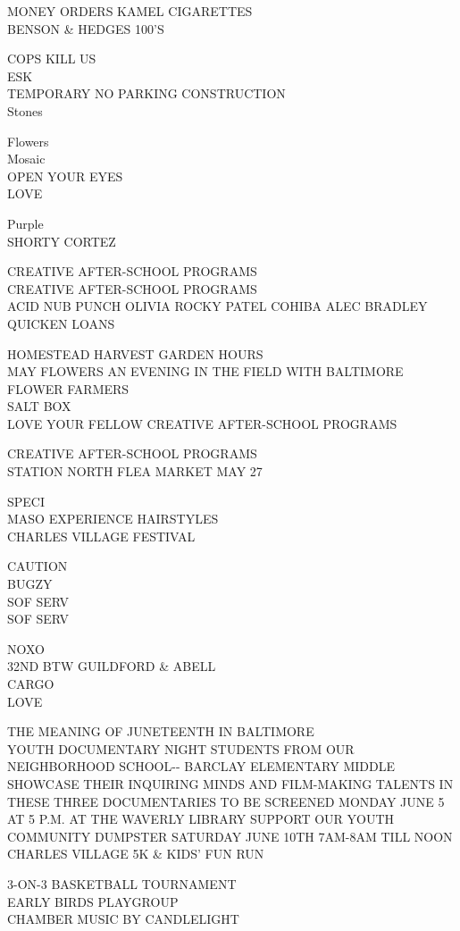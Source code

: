 \documentclass[10pt,letterpaper]{article}
\begin{document}
MONEY ORDERS KAMEL CIGARETTES\\
BENSON \& HEDGES 100'S

COPS KILL US\\
ESK\\
TEMPORARY NO PARKING CONSTRUCTION\\
Stones

Flowers\\
Mosaic\\
OPEN YOUR EYES\\
LOVE

Purple\\
SHORTY CORTEZ

CREATIVE AFTER{-}SCHOOL PROGRAMS\\
CREATIVE AFTER{-}SCHOOL PROGRAMS\\
ACID NUB PUNCH OLIVIA ROCKY PATEL COHIBA ALEC BRADLEY QUICKEN LOANS

HOMESTEAD HARVEST GARDEN HOURS\\
MAY FLOWERS AN EVENING IN THE FIELD WITH BALTIMORE FLOWER FARMERS\\
SALT BOX\\
LOVE YOUR FELLOW CREATIVE AFTER{-}SCHOOL PROGRAMS

CREATIVE AFTER{-}SCHOOL PROGRAMS\\
STATION NORTH FLEA MARKET MAY 27

SPECI\\
MASO EXPERIENCE HAIRSTYLES\\
CHARLES VILLAGE FESTIVAL

CAUTION\\
BUGZY\\
SOF SERV\\
SOF SERV

NOXO\\
32ND BTW GUILDFORD \& ABELL\\
CARGO\\
LOVE

THE MEANING OF JUNETEENTH IN BALTIMORE\\
YOUTH DOCUMENTARY NIGHT STUDENTS FROM OUR NEIGHBORHOOD SCHOOL{-}{-} BARCLAY ELEMENTARY MIDDLE  SHOWCASE THEIR INQUIRING MINDS AND FILM{-}MAKING TALENTS IN THESE THREE DOCUMENTARIES TO BE SCREENED MONDAY JUNE 5 AT 5 P.M. AT THE WAVERLY LIBRARY SUPPORT OUR YOUTH\\
COMMUNITY DUMPSTER SATURDAY JUNE 10TH 7AM{-}8AM TILL NOON\\
CHARLES VILLAGE 5K \& KIDS' FUN RUN

3{-}ON{-}3 BASKETBALL TOURNAMENT\\
EARLY BIRDS PLAYGROUP\\
CHAMBER MUSIC BY CANDLELIGHT
\end{document}
